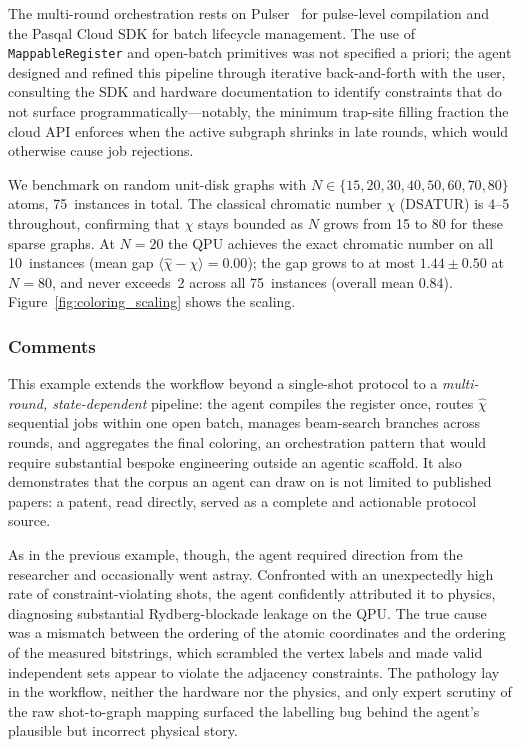 \documentclass[aps,pra,reprint,amssymb,superscriptaddress,nofootinbib,floatfix]{revtex4-2}
\begin{document}
The multi-round orchestration rests on Pulser~\cite{silverio2022pulser} for
pulse-level compilation and the Pasqal Cloud SDK for batch lifecycle management.
The use of \texttt{MappableRegister} and open-batch primitives was not specified
a priori; the agent designed and refined this pipeline through iterative
back-and-forth with the user, consulting the SDK and hardware documentation to
identify constraints that do not surface programmatically---notably, the minimum
trap-site filling fraction the cloud API enforces when the active subgraph shrinks
in late rounds, which would otherwise cause job rejections.

We benchmark on random unit-disk graphs with
$N\in\{15,20,30,40,50,60,70,80\}$ atoms, 75~instances in total.
The classical chromatic number $\chi$ (DSATUR) is 4--5 throughout, confirming that
$\chi$ stays bounded as $N$ grows from 15 to 80 for these sparse graphs.
At $N{=}20$ the QPU achieves the exact chromatic number on all 10~instances
(mean gap $\langle\hat\chi-\chi\rangle{=}0.00$); the gap grows to at most
$1.44\pm0.50$ at $N{=}80$, and never exceeds~2 across all 75~instances
(overall mean $0.84$).
Figure~\ref{fig:coloring_scaling} shows the scaling.

\subsubsection{Comments}

This example extends the workflow beyond a single-shot protocol to a
\emph{multi-round, state-dependent} pipeline: the agent compiles the register once,
routes $\hat\chi$ sequential jobs within one open batch, manages beam-search branches
across rounds, and aggregates the final coloring, an orchestration pattern that would
require substantial bespoke engineering outside an agentic scaffold.
It also demonstrates that the corpus an agent can draw on is not limited to published
papers: a patent, read directly, served as a complete and actionable protocol source. 

As in the previous example, though, the agent required direction from the researcher and
occasionally went astray. Confronted with an unexpectedly high rate of
constraint-violating shots, the agent confidently attributed it to physics, diagnosing
substantial Rydberg-blockade leakage on the QPU. The true cause was a mismatch
between the ordering of the atomic coordinates and the ordering of the measured
bitstrings, which scrambled the vertex labels and made valid independent sets appear to
violate the adjacency constraints. The pathology lay in the workflow, neither the hardware nor the physics, and only expert scrutiny of the raw shot-to-graph mapping surfaced the labelling bug behind the agent's plausible but incorrect physical story. 
\end{document}
